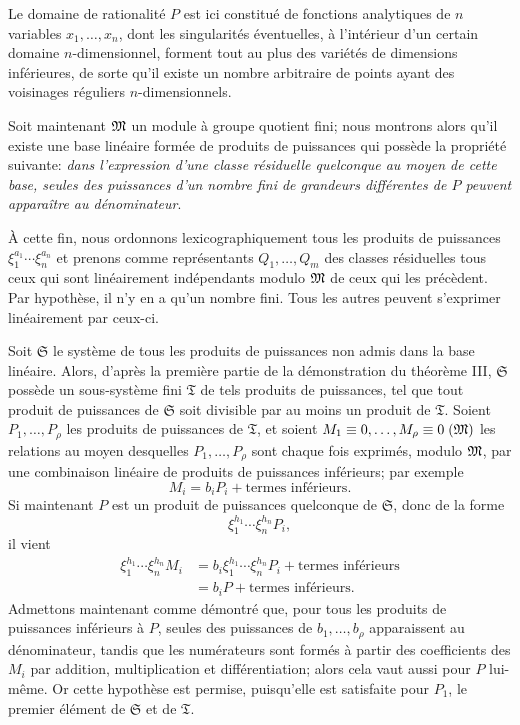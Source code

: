 Le domaine de rationalité $P$ est ici constitué de fonctions analytiques de $n$ variables $x_1,\ldots,x_n$, dont les singularités éventuelles, à l'intérieur d'un certain domaine $n$-dimensionnel, forment tout au plus des variétés de dimensions inférieures, de sorte qu'il existe un nombre arbitraire de points ayant des voisinages réguliers $n$-dimensionnels.

Soit maintenant $\mathfrak{M}$ un module à groupe quotient fini; nous montrons alors qu'il existe une base linéaire formée de produits de puissances qui possède la propriété suivante: \emph{dans l'expression d'une classe résiduelle quelconque au moyen de cette base, seules des puissances d'un nombre fini de grandeurs différentes de $P$ peuvent apparaître au dénominateur}.

À cette fin, nous ordonnons lexicographiquement tous les produits de puissances $\xi_1^{a_1}\cdots\xi_n^{a_n}$ et prenons comme représentants $Q_1,\ldots,Q_m$ des classes résiduelles tous ceux qui sont linéairement indépendants modulo $\mathfrak{M}$ de ceux qui les précèdent. Par hypothèse, il n'y en a qu'un nombre fini. Tous les autres peuvent s'exprimer linéairement par ceux-ci.

Soit $\mathfrak S$ le système de tous les produits de puissances non admis dans la base linéaire. Alors, d'après la première partie de la démonstration du théorème III, $\mathfrak S$ possède un sous-système fini $\mathfrak T$ de tels produits de puissances, tel que tout produit de puissances de $\mathfrak S$ soit divisible par au moins un produit de $\mathfrak T$. Soient $P_1,\ldots,P_\rho$ les produits de puissances de $\mathfrak T$, et soient $M_1\equiv0,\ldots,M_\rho\equiv0\;(\mathfrak{M})$ les relations au moyen desquelles $P_1,\ldots,P_\rho$ sont chaque fois exprimés, modulo $\mathfrak{M}$, par une combinaison linéaire de produits de puissances inférieurs; par exemple
\[
 M_i=b_iP_i+\text{termes inférieurs}.
\]
Si maintenant $P$ est un produit de puissances quelconque de $\mathfrak S$, donc de la forme
\[
 \xi_1^{h_1}\cdots\xi_n^{h_n}P_i,
\]
il vient
\[
\begin{aligned}
 \xi_1^{h_1}\cdots\xi_n^{h_n}M_i
 &=b_i\xi_1^{h_1}\cdots\xi_n^{h_n}P_i+\text{termes inférieurs}\\
 &=b_iP+\text{termes inférieurs}.
\end{aligned}
\]
Admettons maintenant comme démontré que, pour tous les produits de puissances inférieurs à $P$, seules des puissances de $b_1,\ldots,b_\rho$ apparaissent au dénominateur, tandis que les numérateurs sont formés à partir des coefficients des $M_i$ par addition, multiplication et différentiation; alors cela vaut aussi pour $P$ lui-même. Or cette hypothèse est permise, puisqu'elle est satisfaite pour $P_1$, le premier élément de $\mathfrak S$ et de $\mathfrak T$.

